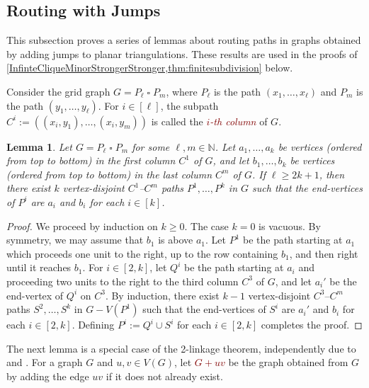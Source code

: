 \documentclass[a4paper,11pt]{article}
\newcommand{\DefNoIndex}[1]{\textcolor{Maroon}{\emph{#1}}}
\newcommand{\defn}[1]{\textcolor{Maroon}{\emph{#1}}\index{#1}}
\theoremstyle{plain}
\newtheorem{lem}[thm]{Lemma}
\theoremstyle{definition}
\newcommand{\CartProd}{\mathbin{\square}}
\renewcommand{\geq}{\geqslant}
\newcommand{\NN}{\mathbb{N}}
\begin{document}
\subsection{Routing with Jumps}
\label{Routing}

This subsection proves a series of lemmas about routing paths in graphs obtained by adding jumps to planar triangulations. These results are used in the proofs of \cref{InfinteCliqueMinorStrongerStronger,thm:finitesubdivision} below. 

Consider the grid graph $G=P_\ell\CartProd P_m$, where $P_\ell$ is the path $(x_1,\dots,x_\ell)$ and $P_m$ is the path $(y_1,\dots,y_\ell)$. For $i\in[\ell]$, the subpath $C^i:=((x_i,y_1),\dots,(x_i,y_m))$ is called the \DefNoIndex{$i$-th column} of $G$. 

\begin{lem} \label{lem:cylinderrouting}
Let $G=P_\ell\CartProd P_m$ for some $\ell,m\in\NN$. Let $a_1, \dots, a_k$ be vertices (ordered from top to bottom) in the first column $C^1$ of $G$, and let $b_1, \dots, b_k$ be vertices (ordered from top to bottom) in the last column $C^m$ of $G$.  If $\ell \geq 2k+1$, then there exist $k$ vertex-disjoint $C^1$--$C^m$ paths $P^1, \dots, P^k$ in $G$ such that the end-vertices of $P^i$ are $a_i$ and $b_i$ for each $i \in [k]$.
\end{lem}

\begin{proof}
We proceed by induction on $k\geq 0$.  The case $k=0$ is vacuous. By symmetry, we may assume that $b_1$ is above $a_1$.  Let $P^1$ be the path starting at $a_1$ which proceeds one unit to the right, up to the row containing $b_1$, and then right until it reaches $b_1$.  For $i \in [2,k]$, let $Q^i$ be the path starting at $a_i$ and proceeding two units to the right to the third column $C^3$ of $G$, and let $a_i'$ be the end-vertex of $Q^i$ on $C^3$. By induction,  there exist $k-1$ vertex-disjoint $C^3$--$C^m$ paths $S^2, \dots, S^k$ in $G-V(P^1)$ such that the end-vertices of $S^i$ are $a_i'$ and $b_i$ for each $i \in [2,k]$. Defining $P^i:=Q^i \cup S^i$ for each $i \in [2,k]$ completes the proof. \end{proof}

The next lemma is a special case of the 2-linkage theorem, independently due to \citet{Thomassen80} and \citet{Seymour80}. For a graph $G$ and $u,v \in V(G)$,  let \defn{$G+uv$} be the graph obtained from $G$ by adding the edge $uv$ if it does not already exist. 
\end{document}
